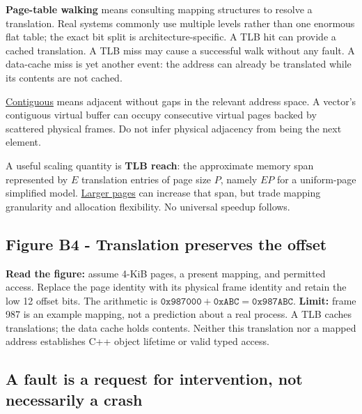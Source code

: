 \textbf{Page-table walking} means consulting mapping structures to resolve a translation. Real systems commonly use multiple levels rather than one enormous flat table; the exact bit split is architecture-specific. A TLB hit can provide a cached translation. A TLB miss may cause a successful walk without any fault. A data-cache miss is yet another event: the address can already be translated while its contents are not cached.

\hyperref[appendix-f897c1ddac8f]{Contiguous} means adjacent without gaps in the relevant address space. A vector's contiguous virtual buffer can occupy consecutive virtual pages backed by scattered physical frames. Do not infer physical adjacency from  being the next element.

A useful scaling quantity is \textbf{TLB reach}: the approximate memory span represented by \(E\) translation entries of page size \(P\), namely \(EP\) for a uniform-page simplified model. \hyperref[appendix-ce688d1acdab]{Larger pages} can increase that span, but trade mapping granularity and allocation flexibility. No universal speedup follows.

\subsection{Figure B4 - Translation preserves the offset}\label{01-foundations-i-ch002-figure-b4---translation-preserves-the-offset}

\hypertarget{01-foundations-i-ch002-figure-b4---translation-preserves-the-offset}{}


\textbf{Read the figure:} assume 4-KiB pages, a present mapping, and permitted access. Replace the page identity with its physical frame identity and retain the low 12 offset bits. The arithmetic is \(\mathtt{0x987000}+\mathtt{0xABC}=\mathtt{0x987ABC}\). \textbf{Limit:} frame 987 is an example mapping, not a prediction about a real process. A TLB caches translations; the data cache holds contents. Neither this translation nor a mapped address establishes C++ object lifetime or valid typed access.

\subsection{A fault is a request for intervention, not necessarily a crash}\label{01-foundations-i-ch002-a-fault-is-a-request-for-intervention-not-necessarily-a-crash}

